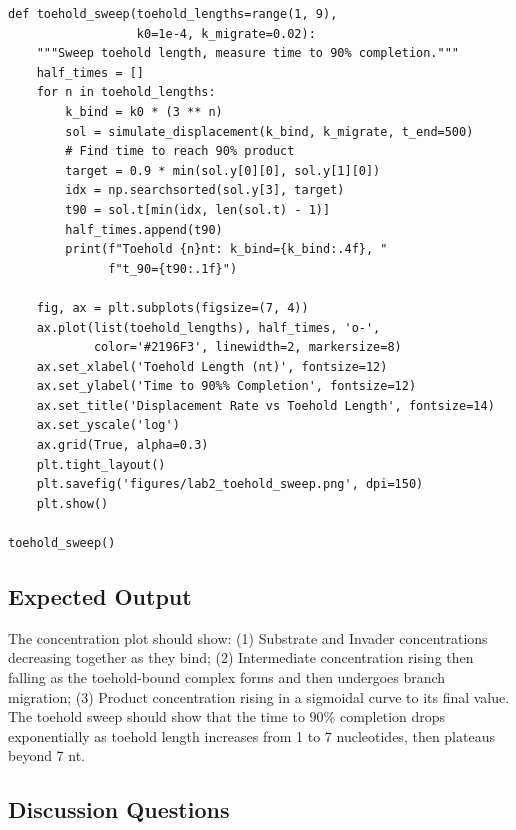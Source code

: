 \begin{lstlisting}[style=dogmapython, caption={Lab 2: Toehold length sweep.}]
def toehold_sweep(toehold_lengths=range(1, 9),
                  k0=1e-4, k_migrate=0.02):
    """Sweep toehold length, measure time to 90% completion."""
    half_times = []
    for n in toehold_lengths:
        k_bind = k0 * (3 ** n)
        sol = simulate_displacement(k_bind, k_migrate, t_end=500)
        # Find time to reach 90% product
        target = 0.9 * min(sol.y[0][0], sol.y[1][0])
        idx = np.searchsorted(sol.y[3], target)
        t90 = sol.t[min(idx, len(sol.t) - 1)]
        half_times.append(t90)
        print(f"Toehold {n}nt: k_bind={k_bind:.4f}, "
              f"t_90={t90:.1f}")

    fig, ax = plt.subplots(figsize=(7, 4))
    ax.plot(list(toehold_lengths), half_times, 'o-',
            color='#2196F3', linewidth=2, markersize=8)
    ax.set_xlabel('Toehold Length (nt)', fontsize=12)
    ax.set_ylabel('Time to 90%% Completion', fontsize=12)
    ax.set_title('Displacement Rate vs Toehold Length', fontsize=14)
    ax.set_yscale('log')
    ax.grid(True, alpha=0.3)
    plt.tight_layout()
    plt.savefig('figures/lab2_toehold_sweep.png', dpi=150)
    plt.show()

toehold_sweep()
\end{lstlisting}

\subsection{Expected Output}

The concentration plot should show: (1) Substrate and Invader concentrations decreasing together as they bind; (2) Intermediate concentration rising then falling as the toehold-bound complex forms and then undergoes branch migration; (3) Product concentration rising in a sigmoidal curve to its final value. The toehold sweep should show that the time to 90\% completion drops exponentially as toehold length increases from 1 to 7 nucleotides, then plateaus beyond 7 nt.

\subsection{Discussion Questions}

